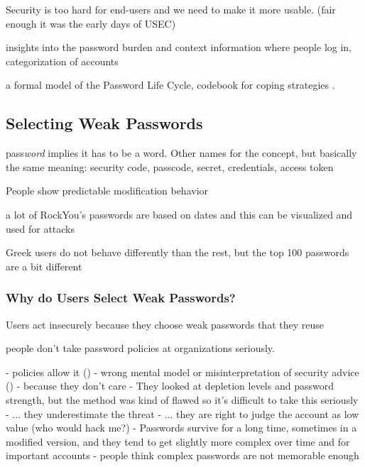 Security is too hard for end-users and we need to make it more usable. (fair enough it was the early days of USEC) \cite{Dourish2004UserStrategiesEveryday}

insights into the password burden and context information where people log in, categorization of accounts \cite{Hayashi2011DiaryStudyPWs}


a formal model of the Password Life Cycle, codebook for coping strategies \cite{Stobert2014PasswordLifeCycle}.

	\subsection{Selecting Weak Passwords}

	pass\textit{word} implies it has to be a word. Other names for the concept, but basically the same meaning: security code, passcode, secret, credentials, access token
	
	\cite{Jakobsson2013BenefitsUnderstandingPWs}
	
	People show predictable modification behavior \cite{Gaw2005ReuseRecycle}
	
	
	a lot of RockYou's passwords are based on dates and this can be visualized and used for attacks \cite{Veras2012VisualizingSemanticsPasswords}
	
	Greek users do not behave differently than the rest, but the top 100 passwords are a bit different \cite{Violettas2014PasswordsAvoidGreece}
	
	
	\cite{Li2017PersonalInformation}

	\subsubsection{Why do Users Select Weak Passwords?}
	
	Users act insecurely because they choose weak passwords that they reuse \cite{Riley2006WhatUsersKnowWhatTheyDo}
	
	people don't take password policies at organizations seriously.  \cite{Weirich2005PersuasivePasswordSecurity}
	
	- policies allow it (\cite{Seitz2017PoliciesReuse})
	- wrong mental model or misinterpretation of security advice (\cite{Ur2015PWCreationLab, Ur2016PerceptionsPassword, Seitz2017PASDJO})
	- because they don't care
	- They looked at depletion levels and password strength, but the method was kind of flawed so it's difficult to take this seriously \cite{Gross2016EffectCognitiveEffort}
	- ... they underestimate the threat
	- ... they are right to judge the account as low value (who would hack me?) \cite{LastPass2016PersonalitiesGetUsHacked}
	- Passwords survive for a long time, sometimes in a modified version, and they tend to get slightly more complex over time and for important accounts\cite{VonZezschwitz2013SurvivalShortest}
	- people think complex passwords are not memorable enough \cite{Woods2018TooManyPasswords}
	
